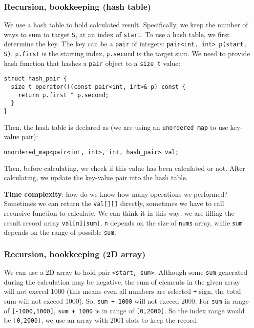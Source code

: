 \documentclass[11pt]{article}
\begin{document}
\subsubsection{Recursion, bookkeeping (hash table)}
\label{sec:org2d7be67}
We use a hash table to hold calculated result. Specifically, we keep the number of ways to sum to target \texttt{S}, at an index of \texttt{start}. To use a hash table, we first determine the key. The key can be a \texttt{pair} of integers: \texttt{pair<int, int> p(start, S)}. \texttt{p.first} is the starting index, \texttt{p.second} is the target sum. We need to provide hash function that hashes a \texttt{pair} object to a \texttt{size\_t} value:
\begin{verbatim}
struct hash_pair {
  size_t operator()(const pair<int, int>& p) const {
    return p.first ^ p.second;
  }
}
\end{verbatim}
Then, the hash table is declared as (we are using an \texttt{unordered\_map} to use key-value pair):
\begin{verbatim}
unordered_map<pair<int, int>, int, hash_pair> val;
\end{verbatim}

Then, before calculating, we check if this value has been calculated or not. After calculating, we update the key-value pair into the hash table.

\textbf{Time complexity}: how do we know how many operations we performed? Sometimes we can return the \texttt{val[][]} directly, sometimes we have to call recursive function to calculate. We can think it in this way: we are filling the result record array \texttt{val[n][sum]}. \texttt{n} depends on the size of \texttt{nums} array, while \texttt{sum} depends on the range of possible \texttt{sum}.

\subsubsection{Recursion, bookkeeping (2D array)}
\label{sec:orgf43b8df}
We can use a 2D array to hold pair \texttt{<start, sum>}. Although some \texttt{sum} generated during the calculation may be negative, the sum of elements in the given array will not exceed 1000 (this means even all numbers are selected \texttt{+} sign, the total sum will not exceed 1000). So, \texttt{sum + 1000} will not exceed 2000. For \texttt{sum} in range of \texttt{[-1000,1000]}, \texttt{sum + 1000} is in range of \texttt{[0,2000]}. So the index range would be \texttt{[0,2000]}, we use an array with 2001 slots to keep the record.
\end{document}
